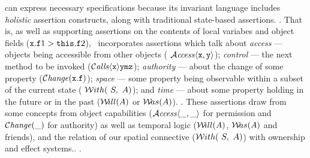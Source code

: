 

\Chainmail can express necessary specifications because its invariant
language includes  \textit{holistic}
assertion constructs, along with traditional state-based assertions.
.
That is, as well as supporting assertions on the contents of local
variabes and object fields (\eg ${\mbox{\tt{x}}}.{\mbox{\tt{f}}}1 > {\mbox{\tt{this}}}.{\mbox{\tt{f}}}2$),
\Chainmail\ incorporates assertions which talk about
%
\textit{access}
--- objects being accessible from other objects (\eg
${\mathcal{A}}\textrm{\textit{ccess}}\langle {\mbox{\tt{x}}},{\mbox{\tt{y}}}\rangle$);
%
\textit{control} --- the
next method to be invoked (${\mathcal{C}}\textrm{\textit{alls}}\langle {\mbox{\tt{x}}}\rangle {{\mbox{\tt{y}}}} {{\mbox{\tt{m}}}} {{{\mbox{\tt{z}}}}}$);
%
\textit{authority} --- about the change of some
property (\eg $\mathcal{C}\textrm{\textit{hange}}({\mbox{\tt{x}}}.{\mbox{\tt{f}}})$);
%
\textit{space} --- some property being observable within a subset of
the current state ( ${\mathcal W}ith(\ S,\ A)$);
%
and
%
\textit{time} --- about some property
holding in the future or in the past (\eg ${{\mathcal W}\!ill}(A)$ or ${{\mathcal W}\!as}(A)$).
%
.
%
%
These assertions draw from some concepts from object capabilities
(${\mathcal{A}}\textrm{\textit{ccess}}\langle \_,\_\rangle$  for  permission and $\mathcal{C}\textrm{\textit{hange}}(\_)$ for
authority) 
as well as temporal logic (${{\mathcal W}\!ill}(A)$, ${{\mathcal W}\!as}(A)$ and friends), and the relation of
our spatial connective (${\mathcal W}ith(\ S,\ A)$)  with ownership and effect
systems..   
%
.

